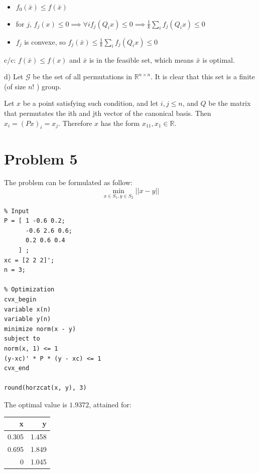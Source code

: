 \documentclass[11pt]{article}
\begin{document}
\begin{itemize}
\item \(f_0(\bar x) \le f(\bar x)\)
\item for \(j\), \(f_j(x) \le 0 \implies \forall i f_j(Q_i x) \le 0 \implies  \frac1k \sum_i f_j(Q_i x) \le 0\)
\item \(f_j\) is convexe, so \(f_j(\bar x)  \le \frac1k \sum_i f_j(Q_i x) \le 0\)
\end{itemize}

c/c: \(f(\bar x) \le f(x)\) and \(\bar x\) is in the feasible set, which means \(\bar x\) is optimal.

d) Let \(\mathcal G\) be the set of all permutations in \(\mathbb R^{n \times n}\). It is clear that this set is a finite (of size \(n!\) ) group.

Let \(x\) be a point satisfying such condition, and let \(i, j \le n\), and \(Q\) be the matrix that permutates the ith and jth vector of the canonical basis.
Then \(x_i = (Px)_i = x_j\).
Therefore \(x\)  has the form \(x_11, x_1 \in \mathbb R\).

\section{Problem 5}
\label{sec:orgheadline5}

The problem can be formulated as follow:
$$\min_{x \in S_1, y \in S_2} ||x - y||$$

\begin{verbatim}
% Input
P = [ 1 -0.6 0.2; 
      -0.6 2.6 0.6;
      0.2 0.6 0.4
    ] ;
xc = [2 2 2]';
n = 3;

% Optimization
cvx_begin
variable x(n)
variable y(n)
minimize norm(x - y)
subject to
norm(x, 1) <= 1
(y-xc)' * P * (y - xc) <= 1
cvx_end

round(horzcat(x, y), 3)
\end{verbatim}


The optimal value is \(1.9372\), attained for:

\begin{center}
\begin{tabular}{rr}
x & y\\
\hline
0.305 & 1.458\\
0.695 & 1.849\\
0 & 1.045\\
\end{tabular}
\end{center}
\end{document}
